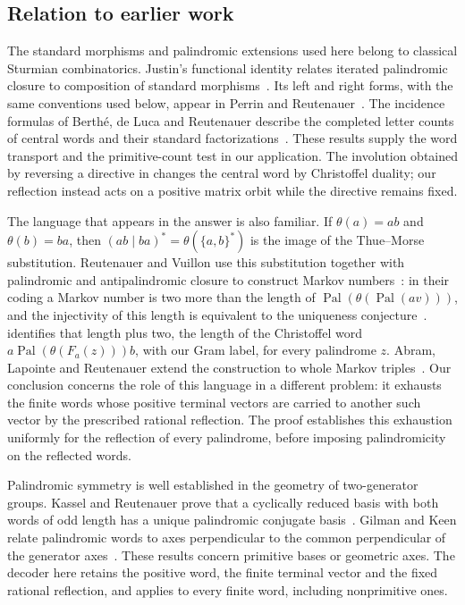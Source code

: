 \subsection{Relation to earlier work}
\label{sec:literature}

The standard morphisms and palindromic extensions used here belong to
classical Sturmian combinatorics. Justin's functional identity relates
iterated palindromic closure to composition of standard
morphisms~\cite[Lemma~2.1]{Justin2005}. Its left and right forms, with the
same conventions used below, appear in Perrin and
Reutenauer~\cite[Section~2]{PerrinReutenauer2023}. The incidence formulas
of Berth\'e, de Luca and Reutenauer describe the completed letter counts
of central words and their standard factorizations~\cite[Section~3]{BertheDeLucaReutenauer2008}.
These results supply the word transport and the primitive-count test in
our application. The involution obtained by reversing a directive in
\cite{BertheDeLucaReutenauer2008} changes the central word by Christoffel
duality; our reflection instead acts on a positive matrix orbit while the
directive remains fixed.

The language that appears in the answer is also familiar. If
$\theta(a)=ab$ and $\theta(b)=ba$, then
$(ab\mid ba)^*=\theta(\{a,b\}^*)$ is the image of the Thue--Morse
substitution. Reutenauer and Vuillon use this substitution together with
palindromic and antipalindromic closure to construct Markov
numbers~\cite{ReutenauerVuillon2017}: in their coding a Markov number is two more than the
length of $\operatorname{Pal}(\theta(\operatorname{Pal}(av)))$, and the injectivity of this
length is equivalent to the uniqueness conjecture~\cite[Theorem~1]{ReutenauerVuillon2017}.
 identifies that length plus two, the length of the Christoffel word
$a\operatorname{Pal}(\theta(F_a(z)))b$, with our Gram label, for every palindrome $z$.
Abram, Lapointe and Reutenauer
extend the construction to whole Markov triples~\cite{AbramLapointeReutenauer2020}.
Our conclusion concerns the role of this language in a different
problem: it exhausts the finite words whose positive terminal vectors
are carried to another such vector by the prescribed rational reflection.
The proof establishes this exhaustion uniformly for the reflection of every
palindrome, before imposing palindromicity on the reflected words.

Palindromic symmetry is well established in the geometry of two-generator
groups. Kassel and Reutenauer prove that a cyclically reduced basis with
both words of odd length has a unique palindromic conjugate
basis~\cite{KasselReutenauer2007}. Gilman and Keen relate palindromic
words to axes perpendicular to the common perpendicular of the generator
axes~\cite{GilmanKeen2009}. These results concern primitive bases or
geometric axes. The decoder here retains the positive word, the finite
terminal vector and the fixed rational reflection, and applies to every
finite word, including nonprimitive ones.

